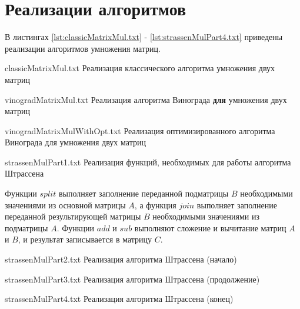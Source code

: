 \section{Реализации алгоритмов}

В листингах \ref{lst:classicMatrixMul.txt} - \ref{lst:strassenMulPart4.txt} приведены реализации алгоритмов умножения матриц.

{classicMatrixMul.txt} %
{Реализация классического алгоритма умножения двух матриц} %

\clearpage

{vinogradMatrixMul.txt} %
{Реализация алгоритма Винограда \textbf{для} умножения двух матриц} %

\clearpage

{vinogradMatrixMulWithOpt.txt} %
{Реализация оптимизированного алгоритма Винограда для умножения двух матриц} %

\clearpage

{strassenMulPart1.txt} %
{Реализация функций, необходимых для работы алгоритма Штрассена} %

Функции $split$ выполняет заполнение переданной подматрицы $B$ необходимыми значениями из основной матрицы $A$, а функция $join$ выполняет заполнение переданной результирующей матрицы $B$ необходимыми значениями из подматрицы $A$. Функции $add$ и $sub$ выполняют сложение и вычитание матриц $A$ и $B$, и результат записывается в матрицу $C$.

{strassenMulPart2.txt} %
{Реализация алгоритма Штрассена (начало)} %

{strassenMulPart3.txt} %
{Реализация алгоритма Штрассена (продолжение)} %

{strassenMulPart4.txt} %
{Реализация алгоритма Штрассена (конец)} %

\clearpage

